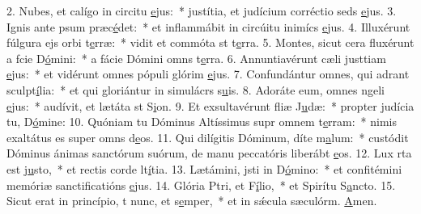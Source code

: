 2. Nubes, et calígo in circitu \uline{e}jus:~* justítia, et judícium corréctio seds \uline{e}jus.
3. Ignis ante psum præc\uline{é}det:~* et inflammábit in circúitu inimícs \uline{e}jus.
4. Illuxérunt fúlgura ejs orbi t\uline{e}rræ:~* vidit et commóta st t\uline{e}rra.
5. Montes, sicut cera fluxérunt a fcie D\uline{ó}mini:~* a fácie Dómini omns t\uline{e}rra.
6. Annuntiavérunt cæli justtiam \uline{e}jus:~* et vidérunt omnes pópuli glórim \uline{e}jus.
7. Confundántur omnes, qui adrant sculpt\uline{í}lia:~* et qui gloriántur in simulácrs s\uline{u}is.
8. Adoráte eum, omnes ngeli \uline{e}jus:~* audívit, et lætáta st S\uline{i}on.
9. Et exsultavérunt fliæ J\uline{u}dæ:~* propter judícia tu, D\uline{ó}mine:
10. Quóniam tu Dóminus Altíssimus supr omnem t\uline{e}rram:~* nimis exaltátus es super omns d\uline{e}os.
11. Qui dilígitis Dóminum, díte m\uline{a}lum:~* custódit Dóminus ánimas sanctórum suórum, de manu peccatóris liberábt \uline{e}os.
12. Lux rta est j\uline{u}sto,~* et rectis corde lt\uline{í}tia.
13. Lætámini, jsti in D\uline{ó}mino:~* et confitémini memóriæ sanctificatións \uline{e}jus.
14. Glória Ptri, et F\uline{í}lio,~* et Spirítu S\uline{a}ncto.
15. Sicut erat in princípio, t nunc, et s\uline{e}mper,~* et in sǽcula sæculórm. \uline{A}men.

